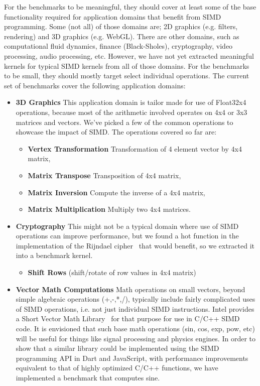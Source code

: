 \documentclass{sigplanconf}
\begin{document}
For the benchmarks to be meaningful, they should cover at least some of the base
functionality required for application domains that benefit from SIMD
programming. Some (not all) of those domains are; 2D graphics (e.g. filters,
rendering) and 3D graphics (e.g. WebGL).  There are other domains, such as
computational fluid dynamics, finance (Black-Sholes), cryptography, video
processing, audio processing, etc. However, we have not yet extracted meaningful
kernels for typical SIMD kernels from all of those domains. For the benchmarks
to be small, they should mostly target select individual operations. The current
set of benchmarks cover the following application domains:

\begin{itemize}
\item
\textbf{3D Graphics}
This application domain is tailor made for use of Float32x4 operations, because
most of the arithmetic involved operates on 4x4 or 3x3 matrices and vectors.
We've picked a few of the common operations to showcase the impact of SIMD.
%
The operations covered so far are:
\begin{itemize}
\item
\textbf{Vertex Transformation} Transformation of 4 element vector by 4x4 matrix,
\item \textbf{Matrix Transpose} Transposition of 4x4 matrix,
\item \textbf{Matrix Inversion} Compute the inverse of a 4x4 matrix,
\item \textbf{Matrix Multiplication} Multiply two 4x4 matrices.
\end{itemize}

\item \textbf{Cryptography}
This might not be a typical domain where use of SIMD operations can improve
performance, but we found a hot function in the implementation of the Rijndael
cipher~\cite{rijndael} that would benefit, so we extracted it into a benchmark
kernel.

\begin{itemize}
\item \textbf{Shift Rows} (shift/rotate of row values in 4x4 matrix)
\end{itemize}

\item
\textbf{Vector Math Computations}
Math operations on small vectors, beyond simple algebraic operations (+,-,*,/),
typically include fairly complicated uses of SIMD operations, i.e. not just
individual SIMD instructions. Intel provides a
Short Vector Math Library~\cite{svml} for that purpose for use in C/C++ SIMD code.
It is envisioned that such base math operations (sin, cos, exp, pow, etc) will
be useful for things like signal processing and physics engines.  In order to
show that a similar library could be implemented using the SIMD programming
API in Dart and JavaScript, with performance improvements equivalent to that of
highly optimized C/C++ functions, we have implemented a benchmark that computes
sine.


\end{itemize}
\end{document}
